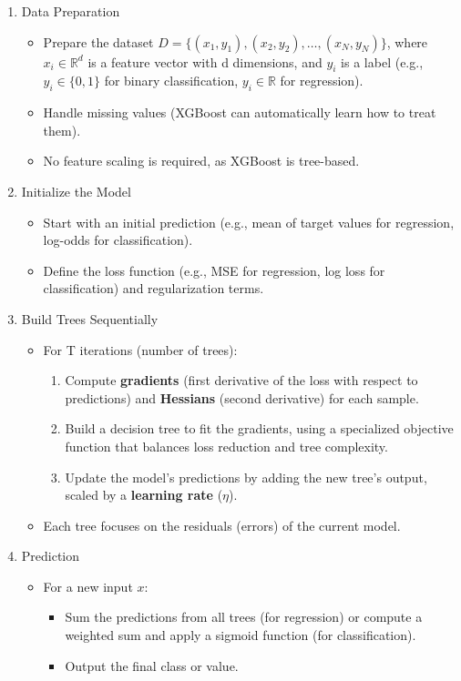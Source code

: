 \begin{enumerate}[label=Step \arabic*:, align=left, leftmargin=20pt,labelsep=1em]
    \item Data Preparation
    \begin{itemize}
        \item Prepare the dataset $D = \{(x_1, y_1), (x_2, y_2), \dots, (x_N, y_N)\}$, where $x_i \in \mathbb{R}^d$ is a feature vector with d dimensions, and $y_i$ is a label (e.g., $y_i \in \{0, 1\}$ for binary classification, $y_i \in \mathbb{R}$ for regression).
        \item Handle missing values (XGBoost can automatically learn how to treat them).
        \item No feature scaling is required, as XGBoost is tree-based.
    \end{itemize}

    \item Initialize the Model
    \begin{itemize}
        \item Start with an initial prediction (e.g., mean of target values for regression, log-odds for classification).
        \item Define the loss function (e.g., MSE for regression, log loss for classification) and regularization terms.
    \end{itemize}

    \item Build Trees Sequentially
    \begin{itemize}
        \item For T iterations (number of trees):
        \begin{enumerate}
            \item Compute \textbf{gradients} (first derivative of the loss with respect to predictions) and \textbf{Hessians} (second derivative) for each sample.
            \item Build a decision tree to fit the gradients, using a specialized objective function that balances loss reduction and tree complexity.
            \item Update the model's predictions by adding the new tree's output, scaled by a \textbf{learning rate} ($\eta$).
        \end{enumerate}
        \item Each tree focuses on the residuals (errors) of the current model.
    \end{itemize}

    \item Prediction
    \begin{itemize}
        \item For a new input $x$:
        \begin{itemize}
            \item Sum the predictions from all trees (for regression) or compute a weighted sum and apply a sigmoid function (for classification).
            \item Output the final class or value.
        \end{itemize}
    \end{itemize}
\end{enumerate}

